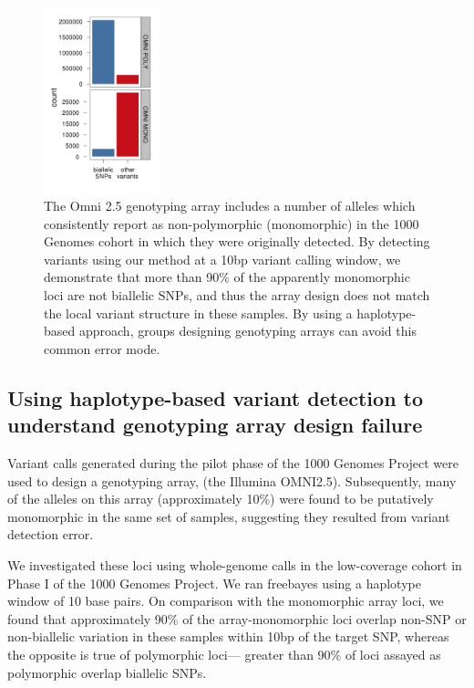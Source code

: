 \documentclass{article}
\begin{document}
\begin{figure}[h!]
\centering
\includegraphics[width=0.3\textwidth]{omni_errors}
\caption{The Omni 2.5 genotyping array includes a number of alleles which consistently report as non-polymorphic (monomorphic) in the 1000 Genomes cohort in which they were originally detected.  By detecting variants using our method at a 10bp variant calling window, we demonstrate that more than 90\% of the apparently monomorphic loci are not biallelic SNPs, and thus the array design does not match the local variant structure in these samples.  By using a haplotype-based approach, groups designing genotyping arrays can avoid this common error mode.}
\label{fig:omnierrors}
\end{figure}


\subsection{Using haplotype-based variant detection to understand genotyping array design failure}
\label{sec:arrayfailure}

Variant calls generated during the pilot phase of the 1000 Genomes Project \citep{1000Gphase1} were used to design a genotyping array, (the Illumina OMNI2.5).  Subsequently, many of the alleles on this array (approximately 10\%) were found to be putatively monomorphic in the same set of samples, suggesting they resulted from variant detection error.

We investigated these loci using whole-genome calls in the low-coverage cohort in Phase I of the 1000 Genomes Project.  We ran freebayes using a haplotype window of 10 base pairs.  On comparison with the monomorphic array loci, we found that approximately 90\% of the array-monomorphic loci overlap non-SNP or non-biallelic variation in these samples within 10bp of the target SNP, whereas the opposite is true of polymorphic loci--- greater than 90\% of loci assayed as polymorphic overlap biallelic SNPs.
\end{document}

